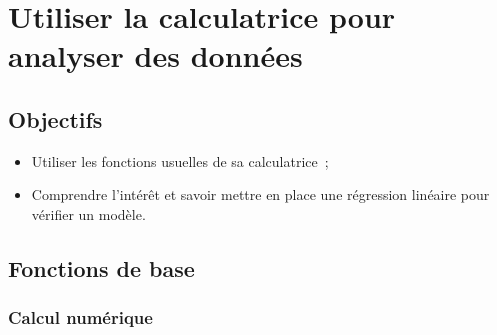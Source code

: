 \documentclass[../main/main.tex]{subfiles}
\begin{document}
\setcounter{chapter}{-1}

\chapter*{Utiliser la calculatrice pour analyser des donn\'ees}

\section{Objectifs}

\begin{itemize}
	\item Utiliser les fonctions usuelles de sa calculatrice~;
	\item Comprendre l'intérêt et savoir mettre en place une régression linéaire
	      pour vérifier un modèle.
\end{itemize}

\section{Fonctions de base}

\subsection{Calcul num\'erique}
\end{document}
